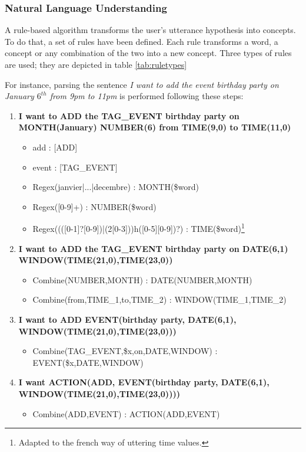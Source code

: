 		
		\subsubsection{Natural Language Understanding}
		
			A rule-based algorithm transforms the user's utterance hypothesis into concepts. To do that, a set of rules have been defined. Each rule transforms a word, a concept or any combination of the two into a new concept. Three types of rules are used; they are depicted in table \ref{tab:ruletypes}
			
			For instance, parsing the sentence \textit{I want to add the event birthday party on January $6^{th}$ from 9pm to 11pm} is performed following these steps:
							
							\begin{enumerate}
						\item \textbf{I want to ADD the TAG\_EVENT birthday party on MONTH(January) NUMBER(6) from TIME(9,0) to TIME(11,0)}
								\begin{itemize}
										\item add : [ADD]
											\item event : [TAG\_EVENT]
											\item Regex(janvier|...|decembre) : MONTH(\$word)
											\item Regex([0-9]+) : NUMBER(\$word)
											\item Regex((([0-1]?[0-9])|(2[0-3]))h([0-5][0-9])?) : TIME(\$word)\footnote{Adapted to the french way of uttering time values.}
									\end{itemize}
							\item \textbf{I want to ADD the TAG\_EVENT birthday party on DATE(6,1) \\ WINDOW(TIME(21,0),TIME(23,0))}
								\begin{itemize}
										\item Combine(NUMBER,MONTH) : DATE(NUMBER,MONTH)
											\item Combine(from,TIME\_1,to,TIME\_2) : WINDOW(TIME\_1,TIME\_2)
									\end{itemize}
							\item \textbf{I want to ADD EVENT(birthday party, DATE(6,1), \\ WINDOW(TIME(21,0),TIME(23,0)))}
								\begin{itemize}
										\item Combine(TAG\_EVENT,\$x,on,DATE,WINDOW) : EVENT(\$x,DATE,WINDOW)
									\end{itemize}
							\item \textbf{I want ACTION(ADD, EVENT(birthday party, DATE(6,1), \\ WINDOW(TIME(21,0),TIME(23,0))))}
								\begin{itemize}
										\item Combine(ADD,EVENT) : ACTION(ADD,EVENT)
									\end{itemize}
					\end{enumerate}
					
